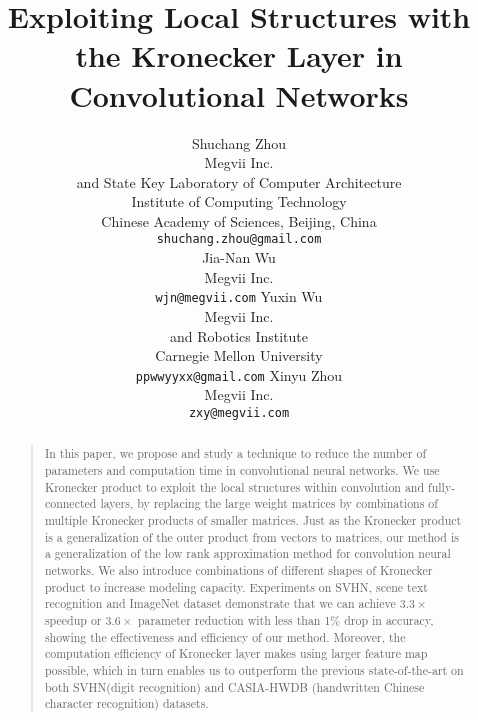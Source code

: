\documentclass{article}
\begin{document}
%
\title{Exploiting Local Structures with the Kronecker Layer in Convolutional Networks}
\author{
\name Shuchang Zhou     \\
\addr
Megvii Inc. \\
and State Key Laboratory of Computer Architecture \\
Institute of Computing Technology \\
Chinese Academy of Sciences, Beijing, China\\
\texttt{shuchang.zhou@gmail.com} \\
          \AND
\name Jia-Nan Wu \\
 \addr Megvii Inc. \\
              \texttt{wjn@megvii.com}
\AND
\name Yuxin Wu \\
 \addr Megvii Inc. \\
and Robotics Institute \\
Carnegie Mellon University \\
\texttt{ppwwyyxx@gmail.com}
\AND
\name Xinyu Zhou     \\
\addr Megvii Inc. \\
\texttt{zxy@megvii.com}
}

\maketitle
\begin{abstract}
\begin{quote}
In this paper, we propose and study a technique to reduce the number of parameters and computation time in convolutional neural networks.
We use Kronecker product to exploit the local structures within convolution and fully-connected layers, by replacing the large weight matrices by combinations of multiple Kronecker products of smaller matrices.
Just as the Kronecker product is a generalization of the outer product from vectors to matrices, our method is a generalization of the low rank
approximation method for convolution neural networks. We also introduce combinations of different shapes of Kronecker product to increase modeling capacity.
Experiments on SVHN, scene text recognition and ImageNet dataset demonstrate that we can achieve $3.3 \times$ speedup or $3.6 \times$ parameter reduction with less than 1\% drop in accuracy, showing the effectiveness and efficiency of our method.
Moreover, the computation efficiency of Kronecker layer makes using larger feature map possible, which in turn enables us to outperform the previous state-of-the-art on both SVHN(digit recognition) and CASIA-HWDB (handwritten Chinese character recognition) datasets. %
\end{quote}
\end{abstract}
\end{document}

